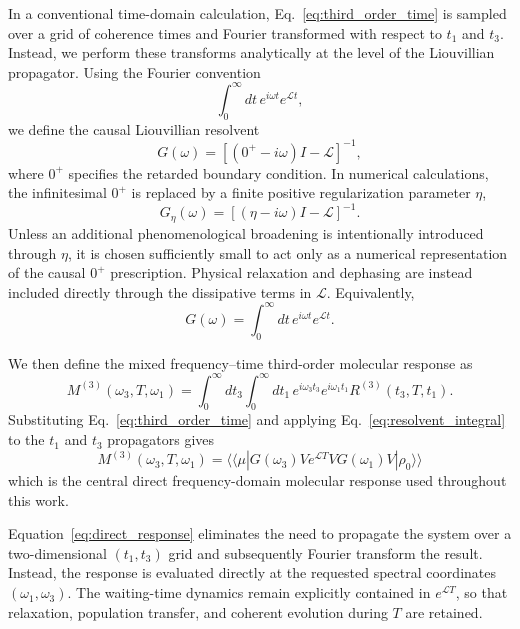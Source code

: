 In a conventional time-domain calculation,
Eq.~\eqref{eq:third_order_time} is sampled over a grid of coherence
times and Fourier transformed with respect to $t_1$ and $t_3$.
Instead, we perform these transforms analytically at the level of the
Liouvillian propagator. Using the Fourier convention
%
\begin{equation}
\int_0^\infty
dt\,
e^{i\omega t}
e^{\mathcal{L}t},
\end{equation}
%
we define the causal Liouvillian resolvent
%
\begin{equation}
G(\omega)
=
\left[
(0^{+}-i\omega)I-\mathcal{L}
\right]^{-1},
\label{eq:resolvent}
\end{equation}
%
where $0^{+}$ specifies the retarded boundary condition.
In numerical calculations, the infinitesimal $0^{+}$ is replaced by a
finite positive regularization parameter $\eta$,
%
\begin{equation}
G_{\eta}(\omega)
=
\left[
(\eta-i\omega)I-\mathcal{L}
\right]^{-1}.
\label{eq:regularized_resolvent}
\end{equation}
%
Unless an additional phenomenological broadening is intentionally
introduced through $\eta$, it is chosen sufficiently small to act only
as a numerical representation of the causal $0^{+}$ prescription.
Physical relaxation and dephasing are instead included directly through
the dissipative terms in $\mathcal{L}$.
Equivalently,
%
\begin{equation}
G(\omega)
=
\int_0^\infty
dt\,
e^{i\omega t}
e^{\mathcal{L}t}.
\label{eq:resolvent_integral}
\end{equation}

We then define the mixed frequency--time third-order molecular response
as
%
\begin{equation}
M^{(3)}(\omega_3,T,\omega_1)
=
\int_0^\infty dt_3
\int_0^\infty dt_1\,
e^{i\omega_3 t_3}
e^{i\omega_1 t_1}
R^{(3)}(t_3,T,t_1).
\label{eq:mixed_response_definition}
\end{equation}
%
Substituting Eq.~\eqref{eq:third_order_time} and applying
Eq.~\eqref{eq:resolvent_integral} to the $t_1$ and $t_3$ propagators
gives
%
\begin{equation}
\boxed{
M^{(3)}(\omega_3,T,\omega_1)
=
\langle\!\langle \mu |
G(\omega_3)
V
e^{\mathcal{L}T}
V
G(\omega_1)
V
|\rho_0\rangle\!\rangle
}
\label{eq:direct_response}
\end{equation}
%
which is the central direct frequency-domain molecular response used
throughout this work.

Equation~\eqref{eq:direct_response} eliminates the need to propagate
the system over a two-dimensional $(t_1,t_3)$ grid and subsequently
Fourier transform the result. Instead, the response is evaluated
directly at the requested spectral coordinates
$(\omega_1,\omega_3)$. The waiting-time dynamics remain explicitly
contained in $e^{\mathcal{L}T}$, so that relaxation, population
transfer, and coherent evolution during $T$ are retained.

